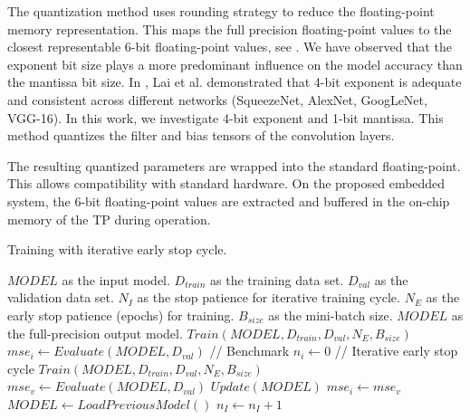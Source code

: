 The quantization method uses rounding strategy to reduce the floating-point memory representation. This maps the full precision floating-point values to the closest representable 6-bit floating-point values, see . We have observed that the exponent bit size plays a more predominant influence on the model accuracy than the mantissa bit size. In \cite{lai2017deep}, Lai et al. demonstrated that 4-bit exponent is adequate and consistent across different networks (SqueezeNet, AlexNet, GoogLeNet, VGG-16). In this work, we investigate 4-bit exponent and 1-bit mantissa. This method quantizes the filter and bias tensors of the convolution layers.

The resulting quantized parameters are wrapped into the standard floating-point. This allows compatibility with standard hardware. On the proposed embedded system, the 6-bit floating-point values are extracted and buffered in the on-chip memory of the TP during operation.

\begin{algorithm}[h!]
	\label{alg:training}
	\caption{Training with iterative early stop cycle.}
	\begin{algorithmic}
		\SetAlgoLined
		\renewcommand{\algorithmicrequire}{\textbf{input:}}
		\renewcommand{\algorithmicensure}{\textbf{output:}}
		\REQUIRE $MODEL$ as the input model.
		\REQUIRE $D_{train}$ as the training data set.
		\REQUIRE $D_{val}$ as the validation data set.
		\REQUIRE $N_{I}$ as the stop patience for iterative training cycle.
		\REQUIRE $N_{E}$ as the early stop patience (epochs) for training.
		\REQUIRE $B_{size}$ as the mini-batch size.
		\ENSURE $MODEL$ as the full-precision output model.
		\STATE $Train(MODEL, D_{train}, D_{val}, N_{E}, B_{size})$
		\STATE $mse_i \gets Evaluate(MODEL, D_{val})$ // Benchmark
		\STATE $n_i \gets 0$
		\STATE // Iterative early stop cycle
		\STATE $Train(MODEL, D_{train}, D_{val}, N_{E}, B_{size})$
		\STATE $mse_v \gets Evaluate(MODEL, D_{val})$
			\STATE $Update(MODEL)$
			\STATE $mse_i \gets mse_v$
		\ELSE
			\STATE $MODEL  \gets LoadPreviousModel()$
			\STATE $n_I \gets n_I + 1$
		\ENDIF
		\ENDWHILE
	\end{algorithmic}
\end{algorithm}



